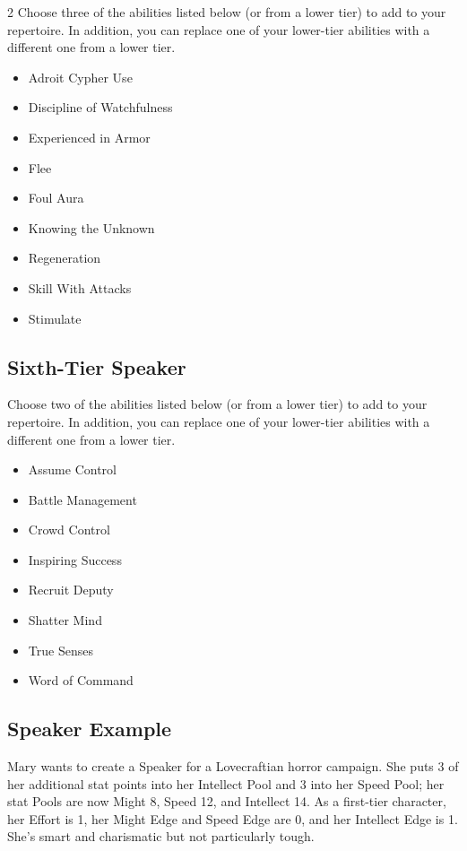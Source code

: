 \begin{multicols}{2}
Choose three of the abilities listed below (or from a lower tier) to add to your repertoire. In addition, you can replace one of your lower-tier abilities with a different one from a lower tier.

\begin{itemize}
\item Adroit Cypher Use
\item Discipline of Watchfulness
\item Experienced in Armor
\item Flee
\item Foul Aura 
\item Knowing the Unknown
\item Regeneration
\item Skill With Attacks
\item Stimulate
\end{itemize}

\subsection{Sixth-Tier Speaker}

Choose two of the abilities listed below (or from a lower tier) to add to your repertoire. In addition, you can replace one of your lower-tier abilities with a different one from a lower tier.

\begin{itemize} 
\item Assume Control
\item Battle Management
\item Crowd Control
\item Inspiring Success
\item Recruit Deputy
\item Shatter Mind
\item True Senses
\item Word of Command
\end{itemize}

\subsection{Speaker Example}

Mary wants to create a Speaker for a Lovecraftian horror campaign. She puts 3 of her additional stat points into her Intellect Pool and 3 into her Speed Pool; her stat Pools are now Might 8, Speed 12, and Intellect 14. As a first-tier character, her Effort is 1, her Might Edge and Speed Edge are 0, and her Intellect Edge is 1. She’s smart and charismatic but not particularly tough.


\end{multicols}
